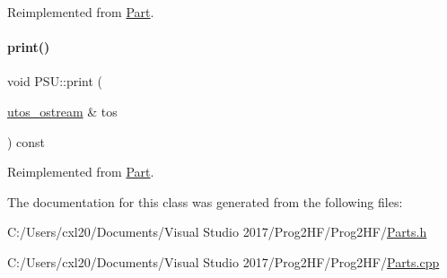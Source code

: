 Reimplemented from \mbox{\hyperlink{class_part_a4fa402b8e8fd4236ff773a7697ab2bc3}{Part}}.

\mbox{\label{class_p_s_u_a81c74aa3a327003c58b89ca2b8602c1d}} 
\paragraph{\texorpdfstring{print()}{print()}\hspace{0.1cm}{\footnotesize\ttfamily [2/2]}}
{\footnotesize\ttfamily void P\+S\+U\+::print (\begin{DoxyParamCaption}\item[{\mbox{\hyperlink{structutos__ostream}{utos\+\_\+ostream}} \&}]{tos }\end{DoxyParamCaption}) const\hspace{0.3cm}{\ttfamily [virtual]}}



Reimplemented from \mbox{\hyperlink{class_part_a9ecabe44ba3415badf82c6a23617a41e}{Part}}.



The documentation for this class was generated from the following files\+:\begin{DoxyCompactItemize}
\item 
C\+:/\+Users/cxl20/\+Documents/\+Visual Studio 2017/\+Prog2\+H\+F/\+Prog2\+H\+F/\mbox{\hyperlink{_parts_8h}{Parts.\+h}}\item 
C\+:/\+Users/cxl20/\+Documents/\+Visual Studio 2017/\+Prog2\+H\+F/\+Prog2\+H\+F/\mbox{\hyperlink{_parts_8cpp}{Parts.\+cpp}}\end{DoxyCompactItemize}
